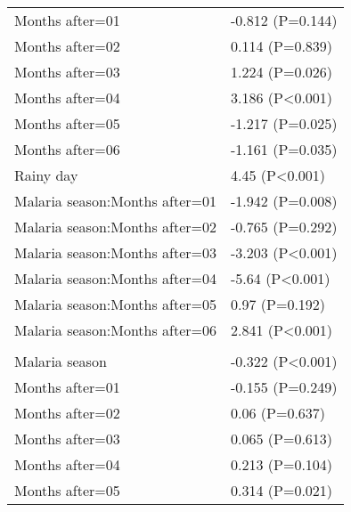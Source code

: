 \documentclass[]{article}
\begin{document}
\begin{longtable}[t]{ll}
\hspace{1em}Months after=01 & -0.812 (P=0.144)\\
\hspace{1em}Months after=02 & 0.114 (P=0.839)\\
\hspace{1em}Months after=03 & 1.224 (P=0.026)\\
\hspace{1em}Months after=04 & 3.186 (P<0.001)\\
\hspace{1em}Months after=05 & -1.217 (P=0.025)\\
\hspace{1em}Months after=06 & -1.161 (P=0.035)\\
\hspace{1em}Rainy day & 4.45 (P<0.001)\\
\hspace{1em}Malaria season:Months after=01 & -1.942 (P=0.008)\\
\hspace{1em}Malaria season:Months after=02 & -0.765 (P=0.292)\\
\hspace{1em}Malaria season:Months after=03 & -3.203 (P<0.001)\\
\hspace{1em}Malaria season:Months after=04 & -5.64 (P<0.001)\\
\hspace{1em}Malaria season:Months after=05 & 0.97 (P=0.192)\\
\hspace{1em}Malaria season:Months after=06 & 2.841 (P<0.001)\\
\addlinespace[1.5em]
\multicolumn{2}{l}{\textbf{Temporary field worker}}\\
\hspace{1em}Malaria season & -0.322 (P<0.001)\\
\hspace{1em}Months after=01 & -0.155 (P=0.249)\\
\hspace{1em}Months after=02 & 0.06 (P=0.637)\\
\hspace{1em}Months after=03 & 0.065 (P=0.613)\\
\hspace{1em}Months after=04 & 0.213 (P=0.104)\\
\hspace{1em}Months after=05 & 0.314 (P=0.021)\\

\end{longtable}
\end{document}
